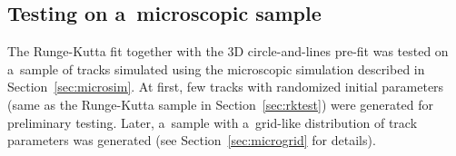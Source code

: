 		
		\subsection{Testing on a~microscopic sample}
			The Runge-Kutta fit together with the 3D circle-and-lines pre-fit was tested on a~sample of tracks simulated using the microscopic simulation described in Section~\ref{sec:microsim}. At first, few tracks with randomized initial parameters (same as the Runge-Kutta sample in Section~\ref{sec:rktest}) were generated for preliminary testing. Later, a~sample with a~grid-like distribution of track parameters was generated (see Section~\ref{sec:microgrid} for details).
			
